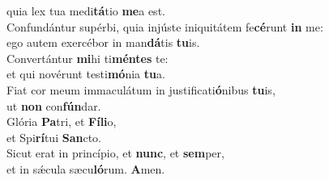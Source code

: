 \oddverse quia lex tua medi\textbf{tá}tio \textbf{me}a est.\\
\evenverse Confundántur supérbi, quia injúste iniquitátem fe\textbf{cé}runt \textbf{in} me:~\*\\
\evenverse ego autem exercébor in man\textbf{dá}tis \textbf{tu}is.\\
\oddverse Convertántur \textbf{mi}hi ti\textbf{mén}\textbf{tes} te:~\*\\
\oddverse et qui novérunt testi\textbf{mó}nia \textbf{tu}a.\\
\evenverse Fiat cor meum immaculátum in justificati\textbf{ó}nibus \textbf{tu}is,~\*\\
\evenverse ut \textbf{non} con\textbf{fún}dar.\\
\oddverse Glória \textbf{Pa}tri, et \textbf{Fí}\textbf{li}o,~\*\\
\oddverse et Spi\textbf{rí}tui \textbf{San}cto.\\
\evenverse Sicut erat in princípio, et \textbf{nunc}, et \textbf{sem}per,~\*\\
\evenverse et in sǽcula sæcu\textbf{ló}rum. \textbf{A}men.\\
